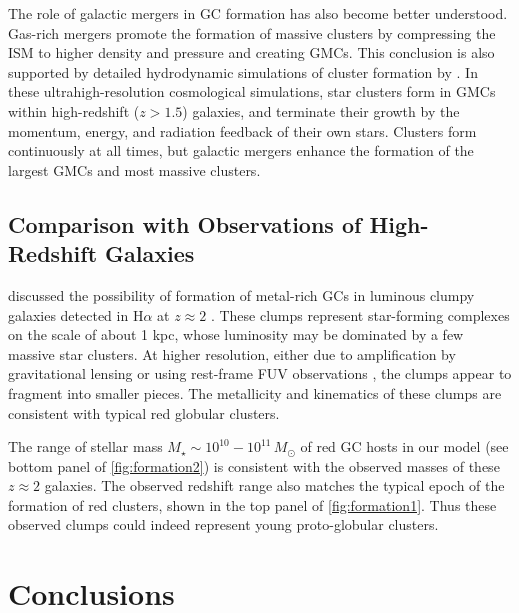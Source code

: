 \documentclass[fleqn,usenatbib]{mnras}
\newcommand{\Msun}{\,M_{\odot}}
\newcommand{\Mstar}{M_{\star}}
\begin{document}
The role of galactic mergers in GC formation has also become better understood. Gas-rich mergers promote the formation of massive clusters by compressing the ISM to higher density and pressure and creating GMCs. This conclusion is also supported by detailed hydrodynamic simulations of cluster formation by \citet{li_etal17, li_etal18}. In these ultrahigh-resolution cosmological simulations, star clusters form in GMCs within high-redshift ($z>1.5$) galaxies, and terminate their growth by the momentum, energy, and radiation feedback of their own stars. Clusters form continuously at all times, but galactic mergers enhance the formation of the largest GMCs and most massive clusters.

\subsection{Comparison with Observations of High-Redshift Galaxies}

\citet{shapiro_etal_2010} discussed the possibility of formation of metal-rich GCs in luminous clumpy galaxies detected in H$\alpha$ at $z\approx 2$ \citep{forster_schreiber_etal_2009, forster_schreiber_etal_2011}. These clumps represent star-forming complexes on the scale of about 1 kpc, whose luminosity may be dominated by a few massive star clusters. At higher resolution, either due to amplification by gravitational lensing \citep{johnson_etal_2017, vanzella_etal_2017} or using rest-frame FUV observations \citep{soto_etal_2017}, the clumps appear to fragment into smaller pieces. The metallicity and kinematics of these clumps are consistent with typical red globular clusters. 

The range of stellar mass $\Mstar \sim 10^{10}-10^{11}\Msun$ of red GC hosts in our model (see bottom panel of \autoref{fig:formation2}) is consistent with the observed masses of these $z\approx 2$ galaxies. The observed redshift range also matches the typical epoch of the formation of red clusters, shown in the top panel of \autoref{fig:formation1}. Thus these observed clumps could indeed represent young proto-globular clusters. 

\section{Conclusions} 
\label{sec:conclusions}
\end{document}
